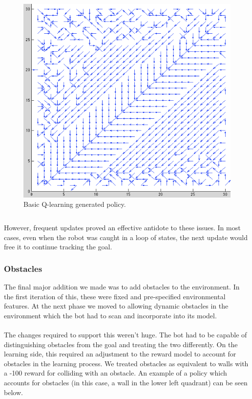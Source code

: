\documentclass{aiaa-tc}%
\begin{document}
\begin{figure}[htbp]
  \centering
  \includegraphics[width=\linewidth]{images/BasicPolicy.png} 
  \caption{Basic Q-learning generated policy.}
  \label{fig:basicQ}
\end{figure}
\clearpage
\begin{verbatim}
\end{verbatim}
However, frequent updates proved an effective antidote to these
issues. In most cases, even when the robot was caught in a loop of
states, the next update would free it to continue tracking the goal.

\subsubsection{Obstacles}
The final major addition we made was to add obstacles to the
environment. In the first iteration of this, these were fixed and
pre-specified environmental features. At the next phase we moved to
allowing dynamic obstacles in the environment which the bot had to
scan and incorporate into its model. \\ \\
The changes required to support this weren't huge. The bot had to be
capable of distinguishing obstacles from the goal and treating the two
differently. On the learning side, this required an adjustment to the
reward model to account for obstacles in the learning
process. We treated obstacles as equivalent to walls with a -100
reward for colliding with an obstacle. An example of a policy which
accounts for obstacles (in this case, a wall in the lower left quadrant) can be
seen below. 
\vspace{.3in}
\end{document}
